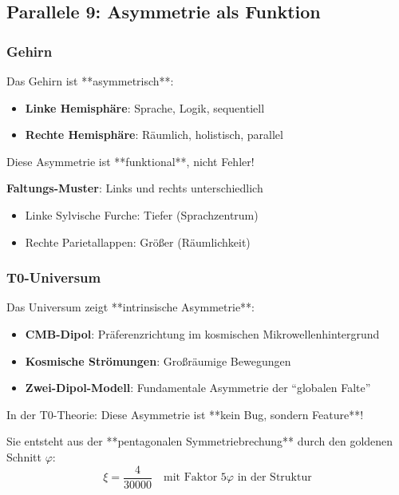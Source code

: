 	\subsection{Parallele 9: Asymmetrie als Funktion}
	
	\subsubsection{Gehirn}
	
	Das Gehirn ist **asymmetrisch**:
	
	\begin{itemize}
		\item \textbf{Linke Hemisphäre}: Sprache, Logik, sequentiell
		\item \textbf{Rechte Hemisphäre}: Räumlich, holistisch, parallel
	\end{itemize}
	
	Diese Asymmetrie ist **funktional**, nicht Fehler!
	
	\textbf{Faltungs-Muster}: Links und rechts unterschiedlich
	\begin{itemize}
		\item Linke Sylvische Furche: Tiefer (Sprachzentrum)
		\item Rechte Parietallappen: Größer (Räumlichkeit)
	\end{itemize}
	
	\subsubsection{T0-Universum}
	
	Das Universum zeigt **intrinsische Asymmetrie**:
	
	\begin{itemize}
		\item \textbf{CMB-Dipol}: Präferenzrichtung im kosmischen Mikrowellenhintergrund
		\item \textbf{Kosmische Strömungen}: Großräumige Bewegungen
		\item \textbf{Zwei-Dipol-Modell}: Fundamentale Asymmetrie der \enquote{globalen Falte}
	\end{itemize}
	
	In der T0-Theorie: Diese Asymmetrie ist **kein Bug, sondern Feature**!
	
	Sie entsteht aus der **pentagonalen Symmetriebrechung** durch den goldenen Schnitt $\varphi$:
	\begin{equation}
		\xi = \frac{4}{30000} \quad \text{mit Faktor } 5\varphi \text{ in der Struktur}
	\end{equation}
	
